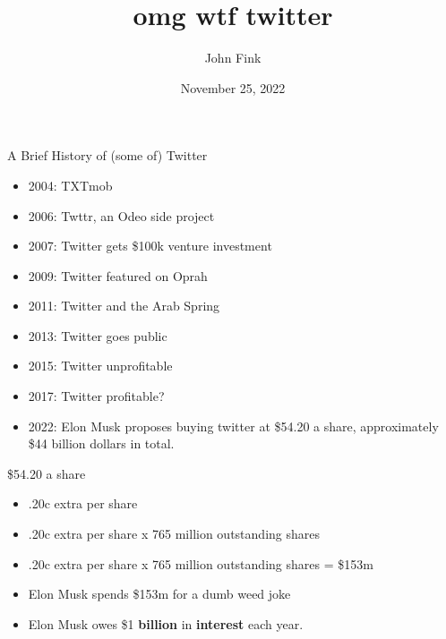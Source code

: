 \documentclass{beamer}
\title{omg wtf twitter}
\author{John Fink}
\date{November 25, 2022}
\begin{document}
\begin{frame}[plain]
    \maketitle
\end{frame}
\begin{frame}{A Brief History of (some of) Twitter}
	\begin{itemize}
		\pause
		\item 2004: TXTmob
		\pause
		\item 2006: Twttr, an Odeo side project
		\pause
		\item 2007: Twitter gets \$100k venture investment
		\pause
		\item 2009: Twitter featured on Oprah
		\pause
		\item 2011: Twitter and the Arab Spring
		\pause
		\item 2013: Twitter goes public
		\pause 
		\item 2015: Twitter unprofitable
		\pause
		\item 2017: Twitter profitable?
		\pause
		\item 2022: Elon Musk proposes buying twitter at \$54.20 a share, approximately \$44 billion dollars in total.
	\end{itemize}
\end{frame}

\begin{frame}{\$54.20 a share}
	\begin{itemize}
		\pause
		\item .20c extra per share
		\pause
		\item .20c extra per share x 765 million outstanding shares
		\pause
		\item .20c extra per share x 765 million outstanding shares = \$153m
		\pause
		\item Elon Musk spends \$153m for a dumb weed joke
		\pause 
		\item Elon Musk owes \$1 \textbf{billion} in \textbf{interest} each year.
	\end{itemize}	
\end{frame}
\end{document}
